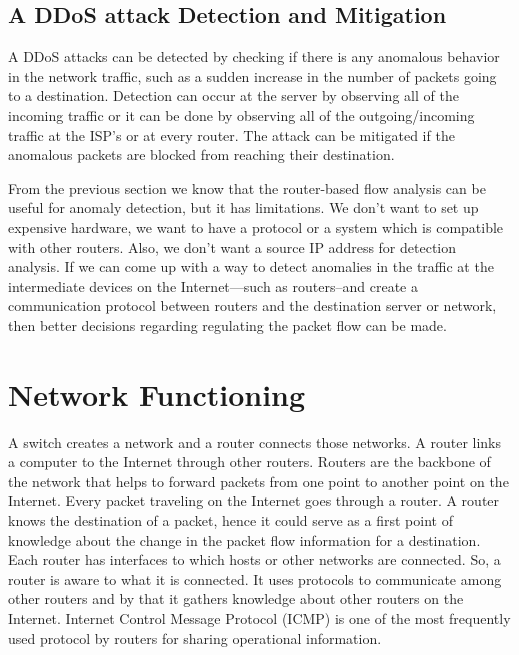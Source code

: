 \documentclass[12pt,oneside,a4paper]{article}
\begin{document}
\subsection{A DDoS attack Detection and Mitigation}

A DDoS attacks can be detected by checking if there is any anomalous behavior in the network traffic, such as a sudden increase in the number of packets going to a destination. Detection can occur at the server by observing all of the incoming traffic or it can be done by observing all of the outgoing/incoming traffic at the ISP's or at every router. The attack can be mitigated if the anomalous packets are blocked from reaching their destination.

From the previous section we know that the router-based flow analysis can be useful for anomaly detection, but it has limitations. We don't want to set up expensive hardware, we want to have a protocol or a system which is compatible with other routers. Also, we don't want a source IP address for detection analysis. If we can come up with a way to detect anomalies in the traffic at the intermediate devices on the Internet---such as routers--and create a communication protocol between routers and the destination server or network, then better decisions regarding regulating the packet flow can be made.

\pagebreak
\section{Network Functioning}

A switch creates a network and a router connects those networks. A router links a computer to the Internet through other routers. Routers are the backbone of the network that helps to forward packets from one point to another point on the Internet. Every packet traveling on the Internet goes through a router\cite{router-switch}. A router knows the destination of a packet, hence it could serve as a first point of knowledge about the change in the packet flow information for a destination. Each router has interfaces to which hosts or other networks are connected. So, a router is aware to what it is connected. It uses protocols to communicate among other routers and by that it gathers knowledge about other routers on the Internet.  Internet Control Message Protocol (ICMP)\cite{icmp} is one of the most frequently used protocol by routers for sharing operational information.\par
\end{document}
